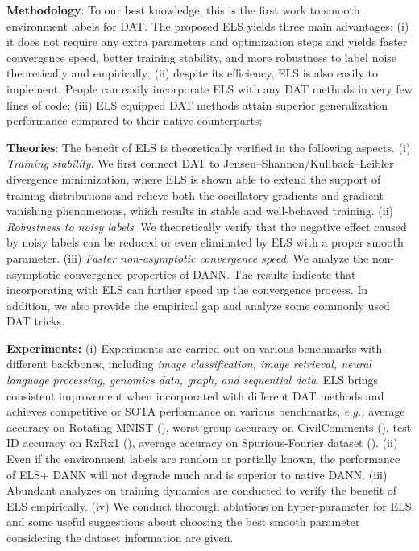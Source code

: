 \documentclass{article} \usepackage{iclr2023_conference,times}
\newcommand{\ls}[0]{ELS\xspace}
\newcommand{\eg}[0]{\textit{e.g., }}
\begin{document}
\textbf{Methodology}: To our best knowledge, this is the first work to smooth environment labels for DAT. The proposed \ls yields three main advantages: (i) it does not require any extra parameters and optimization steps and yields faster convergence speed, better training stability, and more robustness to label noise theoretically and empirically; (ii) despite its efficiency, ELS is also easily to implement. People can easily incorporate ELS with any DAT methods in very few lines of code; (iii) ELS equipped DAT methods attain superior generalization performance compared to their native counterparts;


\textbf{Theories}: The benefit of \ls is theoretically verified in the following aspects. (i) \textit{Training stability}. We first connect DAT to Jensen–Shannon/Kullback–Leibler divergence minimization, where \ls is shown able to extend the support of training distributions and relieve both the oscillatory gradients and gradient vanishing phenomenons, which results in stable and well-behaved training. 
(ii) \textit{Robustness to noisy labels}. We theoretically verify that the negative effect caused by noisy labels can be reduced or even eliminated by \ls with a proper smooth parameter.
(iii) \textit{Faster non-asymptotic convergence speed}. We analyze the non-asymptotic convergence properties of DANN. The results indicate that incorporating with \ls can further speed up the convergence process. 
 In addition, we also provide the empirical gap and analyze some commonly used DAT tricks.



\textbf{Experiments:} (i) Experiments are carried out on various benchmarks with different backbones, including \textit{image classification, image retrieval, neural language processing, genomics data, graph, and sequential data}. \ls brings consistent improvement when incorporated with different DAT methods and achieves competitive or SOTA performance on various benchmarks, \eg average accuracy on Rotating MNIST (), worst group accuracy on CivilComments (), test ID accuracy on RxRx1 (), average accuracy on Spurious-Fourier dataset (). (ii) Even if the environment labels are random or partially known, the performance of \ls+ DANN  will not degrade much and is superior to native DANN. (iii) Abundant analyzes on training dynamics are conducted to verify the benefit of \ls empirically. (iv) We conduct thorough ablations on hyper-parameter for \ls and some useful suggestions about choosing the best smooth parameter considering the dataset information are given.
\end{document}
